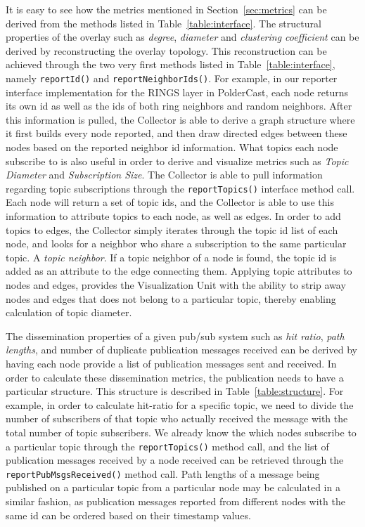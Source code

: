 It is easy to see how the metrics mentioned in Section~\ref{sec:metrics}
can be derived from the methods listed in Table~\ref{table:interface}.
The structural properties of the overlay such as \emph{degree},
\emph{diameter} and \emph{clustering coefficient} can be derived by
reconstructing the overlay topology. This reconstruction can be achieved
through the two very first methods listed in
Table~\ref{table:interface}, namely \texttt{reportId()} and \texttt{reportNeighborIds()}.
For example, in our reporter interface
implementation for the RINGS layer in PolderCast, each node returns its
own id as well as the ids of both ring neighbors and random neighbors.
After this information is pulled, the Collector is able to derive a
graph structure where it first builds every node reported, and then draw
directed edges between these nodes based on the reported neighbor id
information. What topics each node subscribe to is also useful in order
to derive and visualize metrics such as \emph{Topic Diameter} and \emph{Subscription
    Size}. The Collector is able to pull information regarding topic
subscriptions through the \texttt{reportTopics()} interface method call.
Each node will return a set of topic ids, and the Collector is able to
use this information to attribute topics to each node, as well as edges.
In order to add topics to edges, the Collector simply iterates through
the topic id list of each node, and looks for a neighbor who share a
subscription to the same particular topic. A \emph{topic neighbor}. If a
topic neighbor of a node is found, the topic id is added as an attribute
to the edge connecting them. Applying topic attributes to nodes and
edges, provides the Visualization Unit with the ability to strip away
nodes and edges that does not belong to a particular topic, thereby
enabling calculation of topic diameter.

The dissemination properties of a given pub/sub system such as
\emph{hit ratio}, \emph{path lengths}, and number of duplicate publication
messages received can be derived by having each node provide a list of
publication messages sent and received. In order to calculate these
dissemination metrics, the publication needs to have a particular
structure. This structure is described in Table~\ref{table:structure}.
For example, in order to calculate hit-ratio for a specific topic, we
need to divide the number of subscribers of that topic who actually
received the message with the total number of topic subscribers. We
already know the which nodes subscribe to a particular topic through the
\texttt{reportTopics()} method call, and the list of publication
messages received by a node received can be retrieved through the
\texttt{reportPubMsgsReceived()} method call. Path lengths of a
message being published on a particular topic from a particular node may
be calculated in a similar fashion, as publication messages reported from
different nodes with the same id can be ordered based on their timestamp
values.

